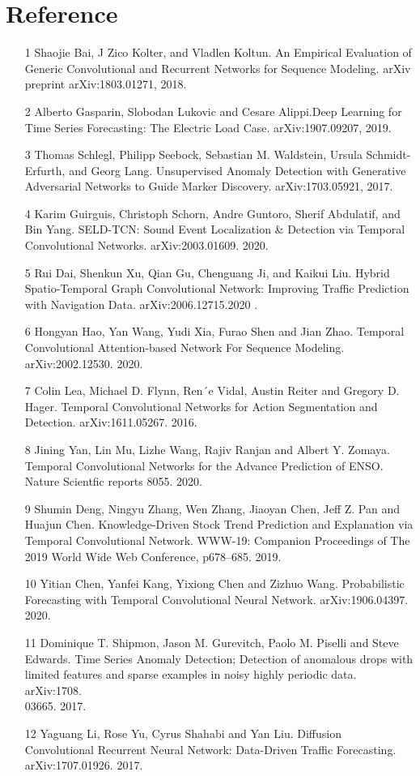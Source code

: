 \chapter*{Reference} 
\label{Reference} 


\begin{itemize}

\item[1] Shaojie Bai, J Zico Kolter, and Vladlen Koltun. An Empirical Evaluation of Generic Convolutional and Recurrent Networks for Sequence Modeling. arXiv preprint arXiv:1803.01271, 2018.
\item[2] Alberto Gasparin, Slobodan Lukovic and Cesare Alippi.Deep Learning for Time Series Forecasting: The Electric Load Case.  arXiv:1907.09207, 2019. 
\item[3] Thomas Schlegl, Philipp Seebock, Sebastian M. Waldstein,
Ursula Schmidt-Erfurth, and Georg Lang. Unsupervised Anomaly Detection with Generative Adversarial Networks to Guide Marker Discovery. arXiv:1703.05921, 2017. 
\item[4] Karim Guirguis, Christoph Schorn, Andre Guntoro, Sherif Abdulatif, and Bin Yang. SELD-TCN: Sound Event Localization \& Detection via Temporal Convolutional Networks. arXiv:2003.01609. 2020.
\item[5] Rui Dai, Shenkun Xu, Qian Gu, Chenguang Ji, and Kaikui Liu. Hybrid Spatio-Temporal Graph Convolutional Network: Improving Traffic Prediction with Navigation Data. arXiv:2006.12715.2020 .
\item[6] Hongyan Hao, Yan Wang, Yudi Xia, Furao Shen and Jian Zhao. Temporal Convolutional Attention-based Network For Sequence Modeling. arXiv:2002.12530. 2020.
\item[7] Colin Lea, Michael D. Flynn, Ren´e Vidal, Austin Reiter and Gregory D. Hager. Temporal Convolutional Networks for Action Segmentation and Detection. arXiv:1611.05267. 2016.
\item[8] Jining Yan, Lin Mu, Lizhe Wang, Rajiv Ranjan and Albert Y. Zomaya. Temporal Convolutional Networks for the Advance Prediction of ENSO. Nature Scientfic reports 8055. 2020.
\item[9] Shumin Deng, Ningyu Zhang, Wen Zhang, Jiaoyan Chen, Jeff Z. Pan and Huajun Chen. Knowledge-Driven Stock Trend Prediction and Explanation via Temporal Convolutional Network. WWW-19: Companion Proceedings of The 2019 World Wide Web Conference, p678–685. 2019.
\item[10] Yitian Chen, Yanfei Kang, Yixiong Chen and Zizhuo Wang. Probabilistic Forecasting with Temporal Convolutional Neural Network. arXiv:1906.04397. 2020.
\item[11] Dominique T. Shipmon, Jason M. Gurevitch, Paolo M. Piselli and Steve Edwards. Time Series Anomaly Detection; Detection of anomalous drops with limited features and sparse examples in noisy highly periodic data. arXiv:1708.\\03665. 2017.
\item[12] Yaguang Li, Rose Yu, Cyrus Shahabi and Yan Liu. Diffusion Convolutional Recurrent Neural Network: Data-Driven Traffic Forecasting. arXiv:1707.01926. 2017.
\newpage
\thispagestyle{plain}


\end{itemize}

